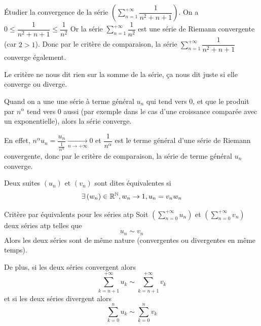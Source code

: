 \documentclass[a4paper, 12pt]{article}
\begin{document}
\begin{exemple}
    Étudier la convergence de la série $\left(\sum\limits_{n=1}^{+\infty} \dfrac{1}{n^2 + n + 1}\right)$.
    \newline
    On a $0 \leq \dfrac{1}{n^2 + n + 1} \leq \dfrac{1}{n^2}$
    Or la série $\sum\limits_{n=1}^{+\infty} \dfrac{1}{n^2}$ est une série de Riemann convergente (car $2 \gt 1$).
    Donc par le critère de comparaison, la série $\sum\limits_{n=1}^{+\infty} \dfrac{1}{n^2 + n + 1}$ converge également.
\end{exemple}

\begin{remarque}
    Le critère ne nous dit rien sur la somme de la série, ça nous dit juste si elle converge ou diverge.
\end{remarque}

\begin{methode}
    Quand on a une une série à terme général $u_n$ qui tend vers 0, et que le produit par $n^\alpha$ tend vers 0 aussi (par exemple dans le cas d'une croissance comparée avec un exponentielle), alors la série converge.

    En effet, $n^\alpha u_n = \dfrac{u_n}{\frac{1}{n^\alpha}} \underset{n \rightarrow +\infty}{\longrightarrow} 0$ et $\dfrac{1}{n^\alpha}$ est le terme général d'une série de Riemann convergente, donc par le critère de comparaison, la série de terme général $u_n$ converge.
\end{methode}

\begin{definition}
    Deux suites $\left( u_n \right)$ et $\left( v_n \right)$ sont dites équivalentes si
    $$
    \exists \left( w_n \right) \in \mathbb{R}^{\mathbb{N}}, w_n \rightarrow 1, u_n = v_n w_n
    $$
\end{definition}

\begin{theoreme}{Critère par équivalents pour les séries atp}{}
    Soit $\left( \sum\limits_{n=0}^{+\infty} u_n \right)$ et $\left( \sum\limits_{n=0}^{+\infty} v_n \right)$ deux séries atp telles que
    $$
    u_n \sim v_n
    $$
    Alors les deux séries sont de même nature (convergentes ou divergentes en même temps).

    De plus, si les deux séries convergent alors
    $$
    \sum\limits_{k=n+1}^{+\infty} u_k \sim \sum\limits_{k=n+1}^{+\infty} v_k
    $$
    et si les deux séries divergent alors
    $$
    \sum\limits_{k=0}^{n} u_k \sim \sum\limits_{k=0}^{n} v_k
    $$
\end{theoreme}
\end{document}
